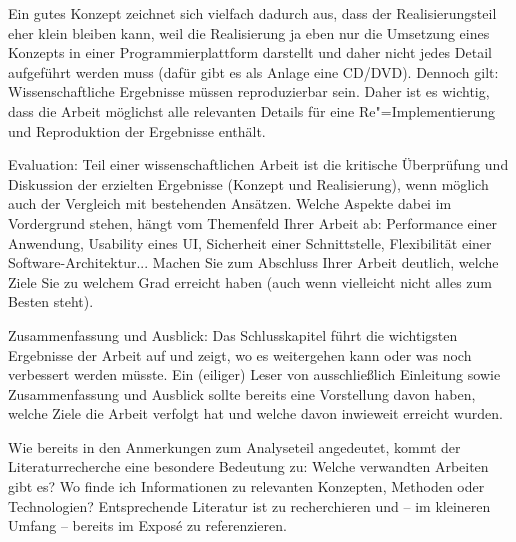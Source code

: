 \documentclass[11pt]{scrartcl}
\newcommand{\qto}[1]{\glqq #1\grqq}				%
\begin{document}
\begin{gliederung}
	\item[] Ein gutes Konzept zeichnet sich vielfach dadurch aus, dass der Realisierungsteil eher klein bleiben kann, weil die Realisierung ja eben \qto{nur} die Umsetzung eines Konzepts in einer Programmierplattform darstellt und daher nicht jedes Detail aufgeführt werden muss (dafür gibt es als Anlage eine CD/DVD). 
%	
	Dennoch gilt: Wissenschaftliche Ergebnisse müssen reproduzierbar sein. Daher ist es wichtig, dass die Arbeit möglichst alle relevanten Details für eine Re"=Implementierung und Reproduktion der Ergebnisse enthält.
	
	\item Evaluation: 
	Teil einer wissenschaftlichen Arbeit ist die kritische Überprüfung und Diskussion der erzielten Ergebnisse (Konzept und Realisierung), wenn möglich auch der Vergleich mit bestehenden Ansätzen.
	Welche Aspekte dabei im Vordergrund stehen, hängt vom Themenfeld Ihrer Arbeit ab: Performance einer Anwendung, Usability eines UI, Sicherheit einer Schnittstelle, Flexibilität einer Software-Architektur... Machen Sie zum Abschluss Ihrer Arbeit deutlich, welche Ziele Sie zu welchem Grad erreicht haben (auch wenn vielleicht nicht alles zum Besten steht).

	\item Zusammenfassung und Ausblick: Das Schlusskapitel führt die wichtigsten Ergebnisse der Arbeit auf und zeigt, wo es weitergehen kann oder was noch verbessert werden müsste. Ein (eiliger) Leser von ausschließlich Einleitung sowie Zusammenfassung und Ausblick sollte bereits eine Vorstellung davon haben, welche Ziele die Arbeit verfolgt hat und welche davon inwieweit erreicht wurden. 

\end{gliederung}

\noindent
Wie bereits in den Anmerkungen zum Analyseteil angedeutet, kommt der Literaturrecherche eine besondere Bedeutung zu: Welche verwandten Arbeiten gibt es? Wo finde ich Informationen zu relevanten Konzepten, Methoden oder Technologien? Entsprechende Literatur ist zu recherchieren und -- im kleineren Umfang -- bereits im Exposé zu referenzieren.
\end{document}

